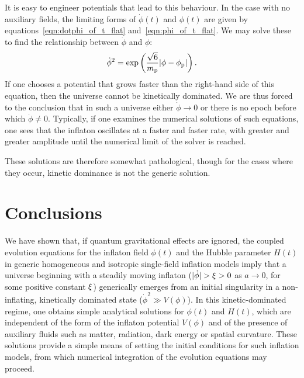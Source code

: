 It is easy to engineer potentials that lead to this behaviour. In the case with no auxiliary fields, the limiting forms of \(\dot{\phi}(t)\) and \(\phi(t)\) are given by equations~\eqref{eqn:dotphi_of_t_flat} and~\eqref{eqn:phi_of_t_flat}. We may solve these to find the relationship between \(\dot{\phi}\) and \(\phi\):
\begin{equation}
  \dot{\phi}^2 = \exp\left(\frac{\sqrt{6}}{m_{\mathrm{p}}} |\phi-\phi_{\mathrm{p}}|\right).
\end{equation}
If one chooses a potential that grows faster than the right-hand side of this equation, then the universe cannot be kinetically dominated.  We are thus forced to the conclusion that in such a universe either \(\dot{\phi}\to 0\) or there is no epoch before which \(\dot{\phi}\ne 0\).  Typically, if one examines the numerical solutions of such equations, one sees that the inflaton oscillates at a faster and faster rate, with greater and greater amplitude until the numerical limit of the solver is reached.

These solutions are therefore somewhat pathological, though for the cases where they occur, kinetic dominance is not the generic solution.









\section{Conclusions}
\label{sec:Conclusions}

We have shown that, if quantum gravitational effects are ignored, the coupled evolution equations for the inflaton field \(\phi(t)\) and the Hubble parameter \(H(t)\) in generic homogeneous and isotropic single-field inflation models imply that a universe beginning with a steadily moving inflaton (\(|\dot{\phi}| > \xi > 0\) as \(a\to 0\), for some positive constant \(\xi\)) generically emerges from an initial singularity in a non-inflating, kinetically dominated state (\(\dot{\phi}^2 \gg V(\phi)\)).  In this kinetic-dominated regime, one obtains simple analytical solutions for \(\phi(t)\) and \(H(t)\), which are independent of the form of the inflaton potential \(V(\phi)\) and of the presence of auxiliary fluids such as matter, radiation, dark energy or spatial curvature. These solutions provide a simple means of setting the initial conditions for such inflation models, from which numerical integration of the evolution equations may proceed.

